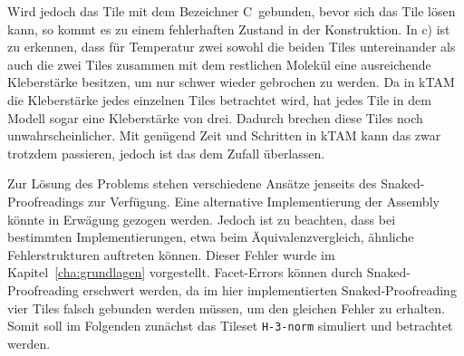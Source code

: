 Wird jedoch das Tile mit dem Bezeichner \glqq C\grqq\, gebunden, bevor sich das Tile lösen kann, so kommt es zu einem fehlerhaften Zustand in der Konstruktion. In c) ist zu erkennen, dass für Temperatur zwei sowohl die beiden Tiles untereinander als auch die zwei Tiles zusammen mit dem restlichen Molekül eine ausreichende Kleberstärke besitzen, um nur schwer wieder gebrochen zu werden. Da in kTAM die Kleberstärke jedes einzelnen Tiles betrachtet wird, hat jedes Tile in dem Modell sogar eine Kleberstärke von drei. Dadurch brechen diese Tiles noch unwahrscheinlicher. Mit genügend Zeit und Schritten in kTAM kann das zwar trotzdem passieren, jedoch ist das dem Zufall überlassen.

Zur Lösung des Problems stehen verschiedene Ansätze jenseits des Snaked-Proofreadings zur Verfügung. Eine alternative Implementierung der Assembly könnte in Erwägung gezogen werden. Jedoch ist zu beachten, dass bei bestimmten Implementierungen, etwa beim Äquivalenzvergleich, ähnliche Fehlerstrukturen auftreten können. Dieser Fehler wurde im Kapitel~\ref{cha:grundlagen} vorgestellt. Facet-Errors können durch Snaked-Proofreading erschwert werden, da im hier implementierten Snaked-Proofreading vier Tiles falsch gebunden werden müssen, um den gleichen Fehler zu erhalten. Somit soll im Folgenden zunächst das Tileset \texttt{H-3-norm} simuliert und betrachtet werden. 



